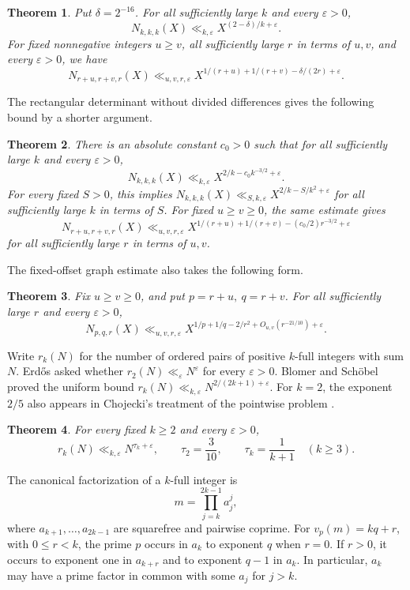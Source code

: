 \documentclass[11pt,reqno]{amsart}
\newtheorem{theorem}{Theorem}
\newcommand{\eps}{\varepsilon}
\begin{document}
\begin{theorem}\label{thm:divided-difference-triples}
Put \(\delta=2^{-16}\). For all sufficiently large \(k\) and
every \(\eps>0\),
\[
 N_{k,k,k}(X)\ll_{k,\eps} X^{(2-\delta)/k+\eps}.
\]
For fixed nonnegative integers \(u\ge v\), all sufficiently
large \(r\) in terms of \(u,v\), and every \(\eps>0\), we have
\[
 N_{r+u,r+v,r}(X)\ll_{u,v,r,\eps}
 X^{1/(r+u)+1/(r+v)-\delta/(2r)+\eps}.
\]
\end{theorem}

The rectangular determinant without divided differences gives
the following bound by a shorter argument.

\begin{theorem}\label{thm:compressed-diagonal}
There is an absolute constant \(c_0>0\) such that for all
sufficiently large \(k\) and every \(\eps>0\),
\[
 N_{k,k,k}(X)\ll_{k,\eps} X^{2/k-c_0 k^{-3/2}+\eps}.
\]
For every fixed \(S>0\), this implies
\(N_{k,k,k}(X)\ll_{S,k,\eps}X^{2/k-S/k^2+\eps}\)
for all sufficiently large \(k\) in terms of \(S\).
For fixed \(u\ge v\ge0\), the same estimate gives
\[
 N_{r+u,r+v,r}(X)\ll_{u,v,r,\eps}
 X^{1/(r+u)+1/(r+v)-(c_0/2)r^{-3/2}+\eps}
\]
for all sufficiently large \(r\) in terms of \(u,v\).
\end{theorem}

The fixed-offset graph estimate also takes the following form.

\begin{theorem}\label{thm:all-offsets}
Fix \(u\ge v\ge0\), and put \(p=r+u,\ q=r+v\).
For all sufficiently large \(r\) and every \(\eps>0\),
\[
 N_{p,q,r}(X)\ll_{u,v,r,\eps}
 X^{1/p+1/q-2/r^2+O_{u,v}(r^{-21/10})+\eps}.
\]
\end{theorem}

Write \(r_k(N)\) for the number of ordered pairs of positive
\(k\)-full integers with sum \(N\).
Erd\H{o}s asked whether \(r_2(N)\ll_\eps N^\eps\) for every \(\eps>0\).
Blomer and Sch\"obel \cite[Corollary~2]{BS} proved the uniform bound
\(r_k(N)\ll_{k,\eps} N^{2/(2k+1)+\eps}\). For \(k=2\), the exponent \(2/5\)
also appears in Chojecki's treatment of the pointwise problem \cite[Theorem~1.2]{Cho}.

\begin{theorem}\label{thm:binary}
For every fixed \(k\ge2\) and every \(\eps>0\),
\[
r_k(N)\ll_{k,\eps}N^{\tau_k+\eps},
\qquad
\tau_2=\frac{3}{10},\qquad \tau_k=\frac1{k+1}\quad(k\ge3).
\]
\end{theorem}

The canonical factorization of a \(k\)-full integer is
\[
m=\prod_{j=k}^{2k-1}a_j^j,
\]
where \(a_{k+1},\ldots,a_{2k-1}\) are squarefree and pairwise coprime.
For \(v_p(m)=kq+r\), with \(0\le r<k\), the prime \(p\) occurs in
\(a_k\) to exponent \(q\) when \(r=0\). If \(r>0\), it occurs to exponent
one in \(a_{k+r}\) and to exponent \(q-1\) in \(a_k\). In particular,
\(a_k\) may have a prime factor in common with some \(a_j\) for \(j>k\).
\end{document}
